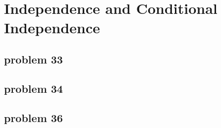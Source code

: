 \section{Independence and Conditional Independence}

\subsection{problem 33}


\subsection{problem 34}


\subsection{problem 36}



